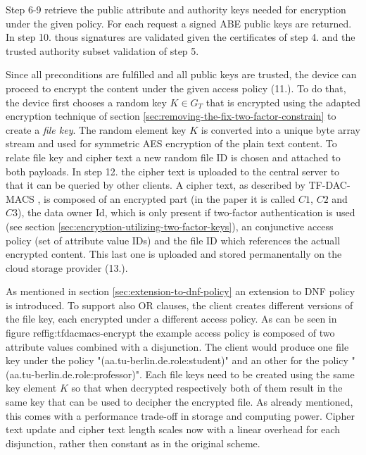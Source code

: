 Step 6-9 retrieve the public attribute and authority keys needed for encryption under the given policy. For each request a signed ABE public keys are returned. In step 10. thous signatures are validated given the certificates of step 4. and the trusted authority subset validation of step 5. 

Since all preconditions are fulfilled and all public keys are trusted, the device can proceed to encrypt the content under the given access policy (11.).  To do that, the device first chooses a random key  $K \in G_T$ that is encrypted using the adapted encryption technique of section \ref{sec:removing-the-fix-two-factor-constrain} to create a \textit{file key}. The random element key $K$ is converted into a unique byte array stream and used for symmetric \ac{AES} encryption of the plain text content. To relate file key and cipher text a new random file ID is chosen and attached to both payloads. In step 12. the cipher text is uploaded to the central server to that it can be queried by other clients. A cipher text, as described by TF-DAC-MACS \cite{li2017two}, is composed of an encrypted part (in the paper it is called $C1$, $C2$ and $C3$), the data owner Id, which is only present if two-factor authentication is used (see section \ref{sec:encryption-utilizing-two-factor-keys}), an conjunctive access policy (set of attribute value IDs) and the file ID which references the actuall encrypted content. This last one is uploaded and stored permanentally on the cloud storage provider (13.).  

As mentioned in section \ref{sec:extension-to-dnf-policy} an extension to DNF policy is introduced. To support also OR clauses, the client creates different versions of the file key, each encrypted under a different access policy. As can be seen in figure ref{fig:tfdacmacs-encrypt} the example access policy is composed of two attribute values combined with a disjunction. The client would produce one file key under the policy "(aa.tu-berlin.de.role:student)" and an other for the policy "(aa.tu-berlin.de.role:professor)". Each file keys need to be created using the same key element $K$ so that when decrypted respectively both of them result in the same key that can be used to decipher the encrypted file. As already mentioned, this comes with a performance trade-off in storage and computing power. Cipher text update and cipher text length scales now with a linear overhead for each disjunction, rather then constant as in the original scheme. 

